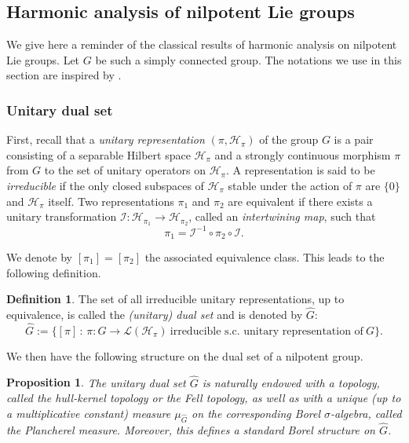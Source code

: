 \documentclass[12pt,a4paper]{amsart}
\theoremstyle{plain}
\newtheorem{proposition}[theorem]{Proposition}
\theoremstyle{definition}
\newtheorem{definition}[theorem]{Definition}
\theoremstyle{remark}
\numberwithin{equation}{section}
\theoremstyle{definition}
\def \Ghat{\widehat{G}}
\def \cH{\mathcal{H}}
\numberwithin{equation}{section}
\begin{document}
\subsection{Harmonic analysis of nilpotent Lie groups}

We give here a reminder of the classical results of harmonic analysis on nilpotent Lie groups. Let $G$ be such a simply connected group. The notations we use in this section are inspired by \cite{FR}.

\subsubsection{Unitary dual set}
\label{subsubsect:unitarydualset}

First, recall that a \emph{unitary representation} $(\pi,\cH_\pi)$ of the group $G$ is a pair consisting of a separable Hilbert space $\cH_\pi$ and a strongly continuous
morphism $\pi$ from $G$ to the set of unitary operators on $\cH_\pi$. A representation is said to be \emph{irreducible} if the only closed subspaces of $\cH_\pi$ stable under the action of
$\pi$ are $\{0\}$ and $\cH_\pi$ itself. Two representations $\pi_1$ and $\pi_2$ are equivalent if there exists a unitary transformation $\mathcal{I}: \cH_{\pi_1}\rightarrow \cH_{\pi_2}$, 
called an \emph{intertwining map}, such that 
\begin{equation*}
 \pi_1 = \mathcal{I}^{-1}\circ \pi_2 \circ \mathcal{I}.
\end{equation*}

We denote by $[\pi_1]=[\pi_2]$ the associated equivalence class. This leads to the following definition.

\begin{definition}
 \label{def:dualset}
 The set of all irreducible unitary representations, up to equivalence, is called the \emph{(unitary) dual set} and is denoted by $\Ghat$:
 \begin{equation*}
 \Ghat := \{[\pi]\,:\, \pi:G \rightarrow \mathcal{L}(\cH_\pi)\ \textrm{irreducible s.c.~unitary representation of}\ G\}.
 \end{equation*}
\end{definition}

We then have the following structure on the dual set of a nilpotent group.

\begin{proposition}
 \label{prop:dualsettopology}
 The unitary dual set $\Ghat$ is naturally endowed with a topology, called the \emph{hull-kernel topology} or the \emph{Fell topology}, as well as with a unique (up to a multiplicative constant) measure $\mu_{\Ghat}$ on the corresponding Borel $\sigma$-algebra, called the \emph{Plancherel measure}. Moreover, this defines a standard Borel structure on $\Ghat$.
\end{proposition}
\end{document}
